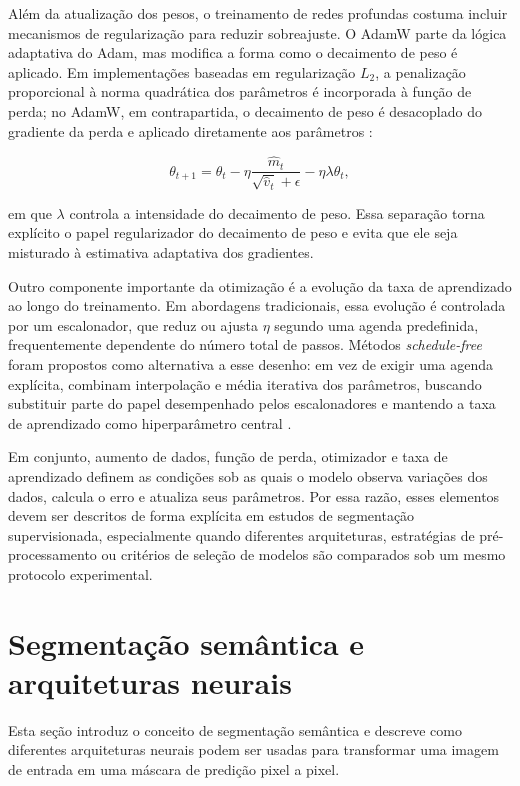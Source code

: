 Além da atualização dos pesos, o treinamento de redes profundas costuma incluir mecanismos de regularização para reduzir sobreajuste. O AdamW parte da lógica adaptativa do Adam, mas modifica a forma como o decaimento de peso é aplicado. Em implementações baseadas em regularização $L_2$, a penalização proporcional à norma quadrática dos parâmetros é incorporada à função de perda; no AdamW, em contrapartida, o decaimento de peso é desacoplado do gradiente da perda e aplicado diretamente aos parâmetros \cite{loshchilov2019decoupled}:

\begin{equation}\label{eq:adamw-update} \theta_{t+1} = \theta_t - \eta \frac{\hat{m}_t}{\sqrt{\hat{v}_t}+\epsilon} - \eta\lambda\theta_t, \end{equation}

em que $\lambda$ controla a intensidade do decaimento de peso. Essa separação torna explícito o papel regularizador do decaimento de peso e evita que ele seja misturado à estimativa adaptativa dos gradientes. 

Outro componente importante da otimização é a evolução da taxa de aprendizado ao longo do treinamento. Em abordagens tradicionais, essa evolução é controlada por um escalonador, que reduz ou ajusta $\eta$ segundo uma agenda predefinida, frequentemente dependente do número total de passos. Métodos \textit{schedule-free} foram propostos como alternativa a esse desenho: em vez de exigir uma agenda explícita, combinam interpolação e média iterativa dos parâmetros, buscando substituir parte do papel desempenhado pelos escalonadores e mantendo a taxa de aprendizado como hiperparâmetro central \cite{defazio2024road}. 

Em conjunto, aumento de dados, função de perda, otimizador e taxa de aprendizado definem as condições sob as quais o modelo observa variações dos dados, calcula o erro e atualiza seus parâmetros. Por essa razão, esses elementos devem ser descritos de forma explícita em estudos de segmentação supervisionada, especialmente quando diferentes arquiteturas, estratégias de pré-processamento ou critérios de seleção de modelos são comparados sob um mesmo protocolo experimental.

\section{Segmentação semântica e arquiteturas neurais}
\label{sec:segmentacao_arquiteturas}

Esta seção introduz o conceito de segmentação semântica e descreve como
diferentes arquiteturas neurais podem ser usadas para transformar uma imagem de
entrada em uma máscara de predição pixel a pixel.


